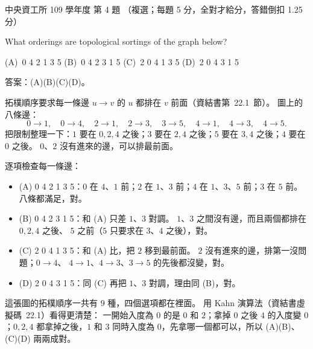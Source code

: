 \begin{pastexam}[label={px:ncu-109-dsa-04}]{中央資工所 109 學年度 第 4 題}
（複選；每題 5 分，全對才給分，答錯倒扣 1.25 分）

What orderings are topological sortings of the graph below?

\begin{center}
\end{center}

(A)~0 4 2 1 3 5 \qquad (B)~0 4 2 3 1 5 \qquad (C)~2 0 4 1 3 5 \qquad (D)~2 0 4 3 1 5
\end{pastexam}

\begin{pastsoln}
答案：(A)(B)(C)(D)。

拓樸順序要求每一條邊 $u \to v$ 的 $u$ 都排在 $v$ 前面（資結書第~22.1~節）。 圖上的八條邊：
\[
0 \to 1,\quad 0 \to 4,\quad 2 \to 1,\quad 2 \to 3,\quad 3 \to 5,\quad 4 \to 1,\quad 4 \to 3,\quad 4 \to 5.
\]
把限制整理一下：$1$ 要在 $0, 2, 4$ 之後；$3$ 要在 $2, 4$ 之後；$5$ 要在 $3, 4$ 之後；$4$ 要在 $0$ 之後。
$0$、$2$ 沒有進來的邊，可以排最前面。

逐項檢查每一條邊：
\begin{itemize}
\item (A) 0 4 2 1 3 5：$0$ 在 $4$、$1$ 前；$2$ 在 $1$、$3$ 前；$4$ 在 $1$、$3$、$5$ 前；$3$ 在 $5$ 前。
八條都滿足，對。
\item (B) 0 4 2 3 1 5：和 (A) 只差 $1$、$3$ 對調。 $1$、$3$ 之間沒有邊，而且兩個都排在 $0, 2, 4$ 之後、
$5$ 之前（$5$ 只要求在 $3$、$4$ 之後），對。
\item (C) 2 0 4 1 3 5：和 (A) 比，把 $2$ 移到最前面。 $2$ 沒有進來的邊，排第一沒問題；$0 \to 4$、
$4 \to 1$、$4 \to 3$、$3 \to 5$ 的先後都沒變，對。
\item (D) 2 0 4 3 1 5：同 (C) 再把 $1$、$3$ 對調，理由同 (B)，對。
\end{itemize}

這張圖的拓樸順序一共有 $9$ 種，四個選項都在裡面。 用 Kahn 演算法（資結書虛擬碼~22.1）看得更清楚：
一開始入度為 $0$ 的是 $0$ 和 $2$；拿掉 $0$ 之後 $4$ 的入度變 $0$；$0, 2, 4$ 都拿掉之後，$1$ 和 $3$
同時入度為 $0$，先拿哪一個都可以，所以 (A)(B)、(C)(D) 兩兩成對。
\end{pastsoln}
